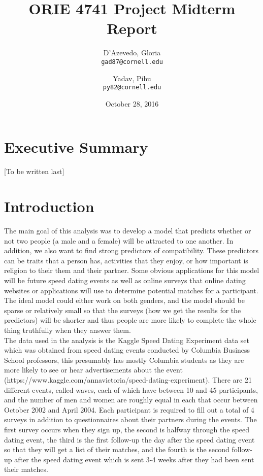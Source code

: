 \documentclass{article}
\title{ORIE 4741 Project Midterm Report}
\author{
  D'Azevedo, Gloria\\
  \texttt{gad87@cornell.edu}
  \and
  Yadav, Pihu\\
  \texttt{py82@cornell.edu}
}
\date{October 28, 2016}
\begin{document}
\maketitle

\section{Executive Summary}

[To be written last]

\section{Introduction}
The main goal of this analysis was to develop a model that predicts whether or not two people (a male and a female) will be attracted to one another.  In addition, we also want to find strong predictors of compatibility.  These predictors can be traits that a  person has, activities that they enjoy, or how important is religion to their them and their partner.  Some obvious applications for this model will be future speed dating events as well as online surveys that online dating websites or applications will use to determine potential matches for a participant. The ideal model could either work on both genders, and the model should be sparse or relatively small so that the surveys (how we get the results for the predictors) will be shorter and thus people are more likely to complete the whole thing truthfully when they answer them.\\

The data used in the analysis is the Kaggle Speed Dating Experiment data set which was obtained from speed dating events conducted by Columbia Business School professors, this presumably has mostly Columbia students as they are more likely to see or hear advertisements about the event (https://www.kaggle.com/annavictoria/speed-dating-experiment). There are 21 different events, called waves, each of which have between 10 and 45 participants, and the number of men and women are roughly equal in each that occur between October 2002 and April 2004.  Each participant is required to fill out a total of 4 surveys in addition to questionnaires about their partners during the events.  The first survey occurs when they sign up, the second is halfway through the speed dating event, the third is the first follow-up the day after the speed dating event so that they will get a list of their matches, and the fourth is the second follow-up after the speed dating event which is sent 3-4 weeks after they had been sent their matches. \\
\end{document}
